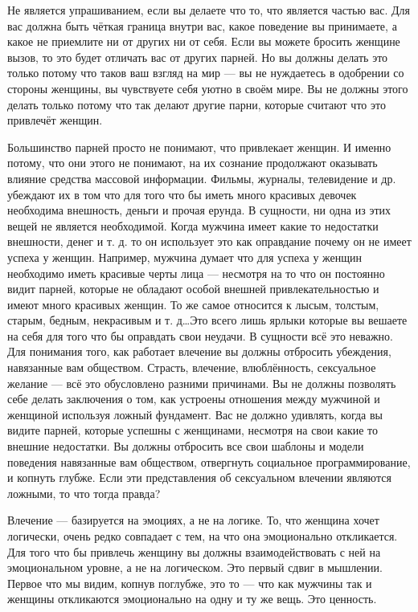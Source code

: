 Не является упрашиванием, если вы делаете что то, что является частью вас. Для вас должна быть чёткая граница внутри вас, какое поведение вы принимаете, а какое не приемлите ни от других ни от себя. Если вы можете бросить женщине вызов, то это будет отличать вас от других парней. Но вы должны делать это только потому что таков ваш взгляд на мир --- вы не нуждаетесь в одобрении со стороны женщины, вы чувствуете себя уютно в своём мире. Вы не должны этого делать только потому что так делают другие парни, которые считают что это привлечёт женщин.

Большинство парней просто не понимают, что привлекает женщин. И именно потому, что они этого не понимают, на их сознание продолжают оказывать влияние средства массовой информации. Фильмы, журналы, телевидение и др. убеждают их в том что для того что бы иметь много красивых девочек необходима внешность, деньги и прочая ерунда. В сущности, ни одна из этих вещей не является необходимой. Когда мужчина имеет какие то недостатки внешности, денег и т. д. то он использует это как оправдание почему он не имеет успеха у женщин. Например, мужчина думает что для успеха у женщин необходимо иметь красивые черты лица --- несмотря на то что он постоянно видит парней, которые не обладают особой внешней привлекательностью и имеют много красивых женщин. То же самое относится к лысым, толстым, старым, бедным, некрасивым и т. д\ldots Это всего лишь ярлыки которые вы вешаете на себя для того что бы оправдать свои неудачи. В сущности всё это неважно. Для понимания того, как работает влечение вы должны отбросить убеждения, навязанные вам обществом. Страсть, влечение, влюблённость, сексуальное желание --- всё это обусловлено разними причинами. Вы не должны позволять себе делать заключения о том, как устроены отношения между мужчиной и женщиной используя ложный фундамент. Вас не должно удивлять, когда вы видите парней, которые успешны с женщинами, несмотря на свои какие то внешние недостатки. Вы должны отбросить все свои шаблоны и модели поведения навязанные вам обществом, отвергнуть социальное программирование, и копнуть глубже. Если эти представления об сексуальном влечении являются ложными, то что тогда правда?

\RULE  Влечение --- базируется на эмоциях, а не на логике. То, что женщина хочет логически, очень редко совпадает с тем, на что она эмоционально откликается. Для того что бы привлечь женщину вы должны взаимодействовать с ней на эмоциональном уровне, а не на логическом. Это первый сдвиг в мышлении. Первое что мы видим, копнув поглубже, это то --- что как мужчины так и женщины откликаются эмоционально на одну и ту же вещь. Это ценность.

